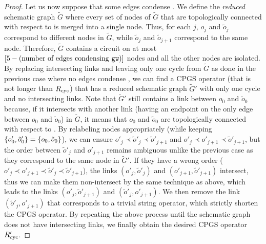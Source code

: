 \documentclass[
 prx,
 reprint,
 superscriptaddress,
 longbibliography,
 dvipsnames
]{revtex4-2}
\begin{document}
\begin{proof}
Let us now suppose that some edges condense \gw.
We define the \emph{reduced} schematic graph $\widetilde{G}$ where every set of nodes of $\tilde{G}$ that are topologically connected with respect to \gw is merged into a single node.
Thus, for each $j$, $o_j$ and $\tilde{o}_j$ correspond to different nodes in $\widetilde{G}$, while $\tilde{o}_j$ and $\tilde{o}_{j+1}$ correspond to the same node.
Therefore, $\widetilde{G}$ contains a circuit on at most $[5 - (\text{number of edges condensing \texttt{gw}})]$ nodes and all the other nodes are isolated.
By replacing intersecting links and leaving only one cycle from $\widetilde{G}$ as done in the previous case where no edges condense \gw, we can find a CPGS operator (that is not longer than $R_{\mathrm{cyc}}$) that has a reduced schematic graph $\widetilde{G}'$ with only one cycle and no intersecting links.
Note that $\widetilde{G}'$ still contains a link between $o_0$ and $\tilde{o}_0$ because, if it intersects with another link (having an endpoint on the only edge between $o_0$ and $\tilde{o}_0$) in $\widetilde{G}$, it means that $o_0$ and $\tilde{o}_0$ are topologically connected with respect to \gw. 
By relabeling nodes appropriately (while keeping $\qty{o'_0, \tilde{o}'_0} = \qty{o_0, \tilde{o}_0}$), we can ensure $o'_j \prec \tilde{o}'_j \prec \tilde{o}'_{j+1}$ and $o'_j \prec o'_{j+1} \prec \tilde{o}'_{j+1}$, but the order between $\tilde{o}'_j$ and $o'_{j+1}$ remains ambiguous unlike the previous case as they correspond to the same node in $\widetilde{G}'$.
If they have a wrong order ($o'_j \prec o'_{j+1} \prec \tilde{o}'_j \prec \tilde{o}'_{j+1}$), the links $(o'_j, \tilde{o}'_j)$ and $(o'_{j+1}, \tilde{o}'_{j+1})$ intersect, thus we can make them non-intersect by the same technique as above, which leads to the links $(o'_j, \tilde{o}'_{j+1})$ and $(\tilde{o}'_j, o'_{j+1})$.
We then remove the link $(\tilde{o}'_j, o'_{j+1})$ that corresponds to a trivial string operator, which strictly shorten the CPGS operator.
By repeating the above process until the schematic graph does not have intersecting links, we finally obtain the desired CPGS operator $R'_{\mathrm{cyc}}$.
\end{proof}

\end{document}
